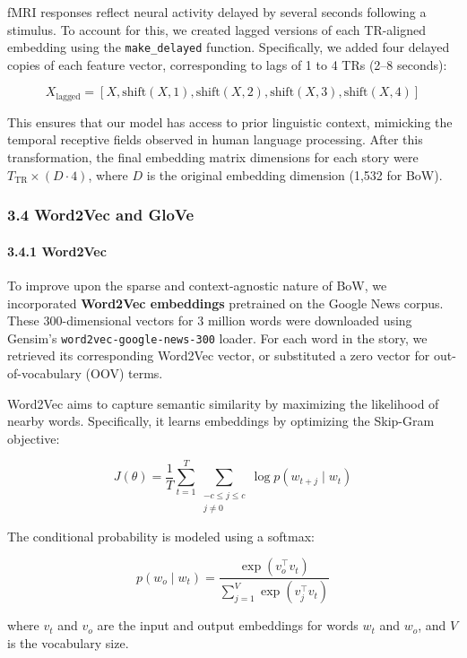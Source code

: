 \documentclass[11pt]{article}
\begin{document}
fMRI responses reflect neural activity delayed by several seconds
following a stimulus. To account for this, we created lagged versions of
each TR-aligned embedding using the \texttt{make\_delayed} function.
Specifically, we added four delayed copies of each feature vector,
corresponding to lags of 1 to 4 TRs (2--8 seconds):

\[
X_{\text{lagged}} = \left[ X, \text{shift}(X, 1), \text{shift}(X, 2), \text{shift}(X, 3), \text{shift}(X, 4) \right]
\]

This ensures that our model has access to prior linguistic context,
mimicking the temporal receptive fields observed in human language
processing. After this transformation, the final embedding matrix
dimensions for each story were \(T_{\text{TR}} \times (D \cdot 4)\),
where \(D\) is the original embedding dimension (1,532 for BoW).

\hypertarget{word2vec-and-glove}{%
\subsubsection{3.4 Word2Vec and GloVe}\label{word2vec-and-glove}}

\hypertarget{word2vec}{%
\paragraph{3.4.1 Word2Vec}\label{word2vec}}

To improve upon the sparse and context-agnostic nature of BoW, we
incorporated \textbf{Word2Vec embeddings} pretrained on the Google News
corpus. These 300-dimensional vectors for 3 million words were
downloaded using Gensim's \texttt{word2vec-google-news-300} loader. For
each word in the story, we retrieved its corresponding Word2Vec vector,
or substituted a zero vector for out-of-vocabulary (OOV) terms.

Word2Vec aims to capture semantic similarity by maximizing the
likelihood of nearby words. Specifically, it learns embeddings by
optimizing the Skip-Gram objective:

\[
J(\theta) = \frac{1}{T} \sum_{t=1}^{T} \sum_{\substack{-c \leq j \leq c \\ j \neq 0}} \log p(w_{t+j} \mid w_t)
\]

The conditional probability is modeled using a softmax:

\[
p(w_o \mid w_t) = \frac{\exp(v_o^\top v_t)}{\sum_{j=1}^{V} \exp(v_j^\top v_t)}
\]

where \(v_t\) and \(v_o\) are the input and output embeddings for words
\(w_t\) and \(w_o\), and \(V\) is the vocabulary size.
\end{document}
